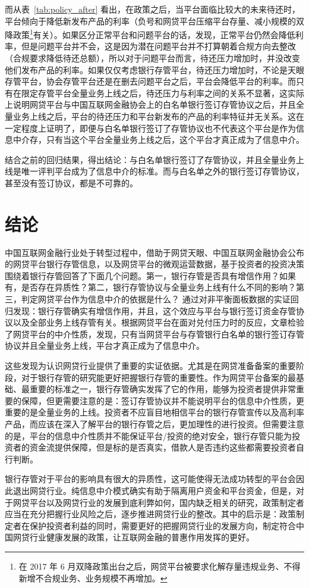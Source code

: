 \documentclass[lang=cn,11pt]{elegantpaper}
\begin{document}
而从表~\ref{tab:policy_after} 看出，在政策之后，当平台面临比较大的未来待还时，平台倾向于降低新发布产品的利率（负号和网贷平台压缩平台存量、减小规模的双降政策\footnote{在 2017 年 6 月双降政策出台之后，网贷平台被要求化解存量违规业务、不得新增不合规业务、业务规模不再增加。}有关）。如果区分正常平台和问题平台的话，发现，正常平台仍然会降低利率，但是问题平台并不会，这是因为潜在问题平台并不打算朝着合规方向去整改（合规要求降低待还总额），所以对于问题平台而言，待还压力增加时，并没改变他们发布产品的利率。如果仅仅考虑银行存管平台，待还压力增加时，不论是天眼存管平台，协会存管平台还是在删去问题平台之后，平台会降低平台的利率。而只有在限定存管平台全量业务上线之后，待还压力与利率之间的关系不显著，这实际上说明网贷平台与中国互联网金融协会上的白名单银行签订存管协议之后，并且全量业务上线之后，平台的待还压力和平台新发布的产品的利率特征并无关系。这在一定程度上证明了，即便与白名单银行签订了存管协议也不代表这个平台是作为信息中介存，只有当这个平台全量业务上线之后，这个平台才真正成为了信息中介。

结合之前的回归结果，得出结论：与白名单银行签订了存管协议，并且全量业务上线是唯一评判平台成为了信息中介的标准。而与白名单之外的银行签订存管协议，甚至没有签订协议，都是不可靠的。

\section{结论}
中国互联网金融行业处于转型过程中，借助于网贷天眼、中国互联网金融协会公布的网贷平台银行存管信息，以及网贷平台的微观运营数据，基于投资者的投资决策围绕着银行存管回答了下面几个问题。第一，银行存管是否具有增信作用？如果有，是否存在异质性？第二，银行存管协议与全量业务上线有什么不同的影响？第三，判定网贷平台作为信息中介的依据是什么？
通过对非平衡面板数据的实证回归发现：银行存管确实有增信作用，并且，这个效应与平台与银行签订资金存管协议以及全部业务上线存管有关。根据网贷平台在面对兑付压力时的反应，文章检验了网贷平台的中介性质，发现，只有当网贷平台与存管银行白名单的银行签订存管协议并且全量业务上线，平台才真正成为了信息中介。

这些发现为认识网贷行业提供了重要的实证依据。尤其是在网贷准备备案的重要阶段，对于银行存管的研究能更好把握银行存管的重要性。作为网贷平台备案的最基础、最重要的标准之一，银行存管确实发挥了它的作用，能够为投资者提供非常重要的保障，但更需要注意的是：签订存管协议并不能说明平台的信息中介性质，更重要的是全量业务的上线。投资者不应盲目地相信平台的银行存管宣传以及高利率产品，而应该在深入了解平台的银行存管之后，更加理性的进行投资。但需要注意的是，平台的信息中介性质并不能保证平台/投资的绝对安全，银行存管只能为投资者的资金流提供保障，但是标的是否真实，借款人是否违约这些都需要投资者自行判断。

银行存管对于平台的影响具有很大的异质性，这可能使得无法成功转型的平台会因此退出网贷行业。纯信息中介模式确实有助于隔离用户资金和平台资金，但是，对于网贷平台以及网贷行业的发展到底利弊如何，国内缺乏相关的研究，政策制定者应当在充分把握行业风险之后，逐步推进网贷行业的整改。其中的启示是：政策制定者在保护投资者利益的同时，需要更好的把握网贷行业的发展方向，制定符合中国网贷行业健康发展的政策，让互联网金融的普惠作用发挥的更好。



\end{document}
